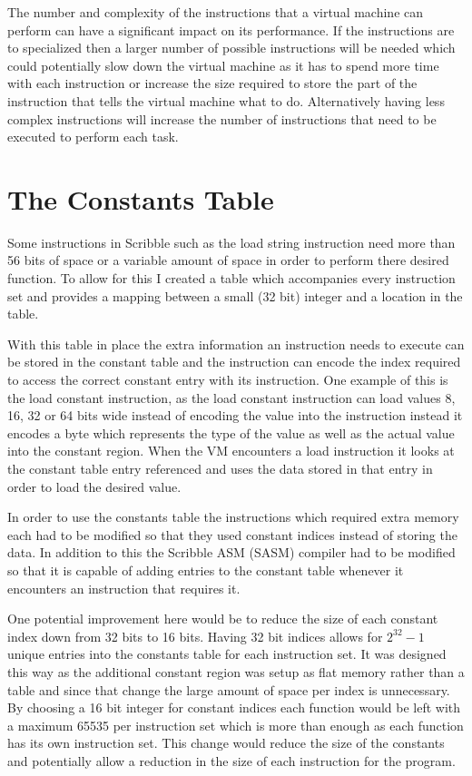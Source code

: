 \documentclass[]{final_report}
\begin{document}
The number and complexity of the instructions that a virtual machine can perform can have a significant impact on its performance. If the instructions are to specialized then a larger number of possible instructions will be needed which could potentially slow down the virtual machine as it has to spend more time with each instruction or increase the size required to store the part of the instruction that tells the virtual machine what to do. Alternatively having less complex instructions will increase the number of instructions that need to be executed to perform each task.

\section{The Constants Table}

Some instructions in Scribble such as the load string instruction need more than 56 bits of space or a variable amount of space in order to perform there desired function. To allow for this I created a table which accompanies every instruction set and provides a mapping between a small (32 bit) integer and a location in the table.

With this table in place the extra information an instruction needs to execute can be stored in the constant table and the instruction can encode the index required to access the correct constant entry with its instruction. One example of this is the load constant instruction, as the load constant instruction can load values 8, 16, 32 or 64 bits wide instead of encoding the value into the instruction instead it encodes a byte which represents the type of the value as well as the actual value into the constant region. When the VM encounters a load instruction it looks at the constant table entry referenced and uses the data stored in that entry in order to load the desired value.

In order to use the constants table the instructions which required extra memory each had to be modified so that they used constant indices instead of storing the data. In addition to this the Scribble ASM (SASM) compiler had to be modified so that it is capable of adding entries to the constant table whenever it encounters an instruction that requires it.

One potential improvement here would be to reduce the size of each constant index down from 32 bits to 16 bits. Having 32 bit indices allows for \begin{math}2^{32} - 1\end{math} unique entries into the constants table for each instruction set. It was designed this way as the additional constant region was setup as flat memory rather than a table and since that change the large amount of space per index is unnecessary. By choosing a 16 bit integer for constant indices each function would be left with a maximum 65535 per instruction set which is more than enough as each function has its own instruction set. This change would reduce the size of the constants and potentially allow a reduction in the size of each instruction for the program.
\end{document}
